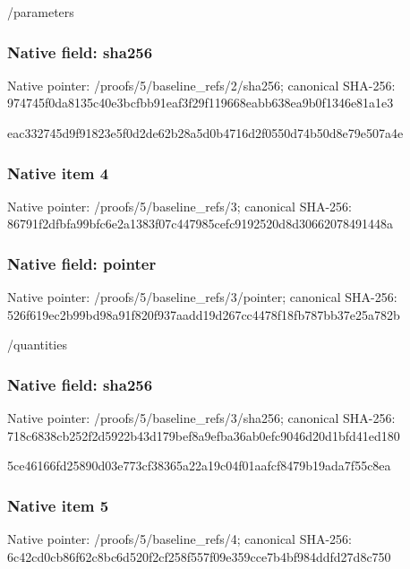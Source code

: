 \documentclass[10pt,a4paper]{article}
\begin{document}
\begingroup\raggedright\sloppy /\allowbreak{}parameters\par\endgroup

\subsubsection{Native field: sha256}
Native pointer: /proofs/5/baseline\_\allowbreak{}refs/2/sha256; canonical SHA-256: 974745f0da8135c40e3bcfbb91eaf3f29f119668eabb638ea9b0f1346e81a1e3

\begingroup\raggedright\sloppy eac332745d9f91823e5f0d2de62b28a5d0b4716d2f0550d74b50d8e79e507a4e\par\endgroup

\subsubsection{Native item 4}
Native pointer: /proofs/5/baseline\_\allowbreak{}refs/3; canonical SHA-256: 86791f2dfbfa99bfc6e2a1383f07c447985cefc9192520d8d30662078491448a

\subsubsection{Native field: pointer}
Native pointer: /proofs/5/baseline\_\allowbreak{}refs/3/pointer; canonical SHA-256: 526f619ec2b99bd98a91f820f937aadd19d267cc4478f18fb787bb37e25a782b

\begingroup\raggedright\sloppy /\allowbreak{}quantities\par\endgroup

\subsubsection{Native field: sha256}
Native pointer: /proofs/5/baseline\_\allowbreak{}refs/3/sha256; canonical SHA-256: 718c6838cb252f2d5922b43d179bef8a9efba36ab0efc9046d20d1bfd41ed180

\begingroup\raggedright\sloppy 5ce46166fd25890d03e773cf38365a22a19c04f01aafcf8479b19ada7f55c8ea\par\endgroup

\subsubsection{Native item 5}
Native pointer: /proofs/5/baseline\_\allowbreak{}refs/4; canonical SHA-256: 6c42cd0cb86f62c8bc6d520f2cf258f557f09e359cce7b4bf984ddfd27d8c750
\end{document}
